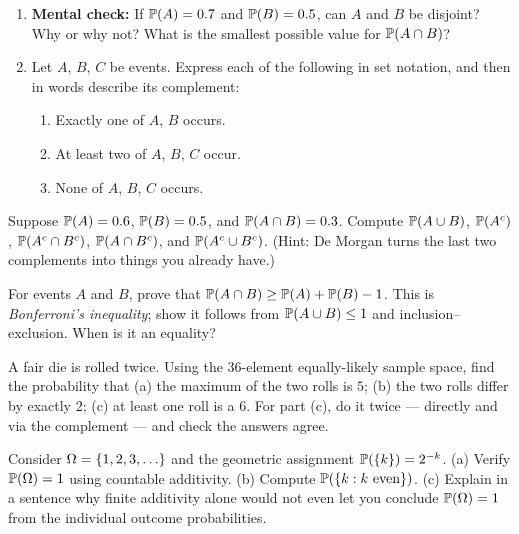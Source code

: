 \begin{exercise}
\label{ch03:exr-translate}
\begin{enumerate}[label=(\alph*)]
\item \textbf{Mental check:} If $\P(A) = 0.7$ and $\P(B) = 0.5$, can $A$ and $B$
be disjoint? Why or why not? What is the smallest possible value for
$\P(A \cap B)$?
\item Let $A$, $B$, $C$ be events. Express each of the following in set notation,
and then in words describe its complement:
  \begin{enumerate}[label=(\roman*)]
  \item Exactly one of $A$, $B$ occurs.
  \item At least two of $A$, $B$, $C$ occur.
  \item None of $A$, $B$, $C$ occurs.
  \end{enumerate}
\end{enumerate}
\end{exercise}

\begin{exercise}
\label{ch03:exr-warmup}
Suppose $\P(A) = 0.6$, $\P(B) = 0.5$, and $\P(A \cap B) = 0.3$. Compute
$\P(A \cup B)$, $\P(A^c)$, $\P(A^c \cap B^c)$, $\P(A \cap B^c)$, and
$\P(A^c \cup B^c)$. (Hint: De Morgan turns the last two complements into things
you already have.)
\end{exercise}

\begin{exercise}
\label{ch03:exr-bound}
For events $A$ and $B$, prove that $\P(A \cap B) \ge \P(A) + \P(B) - 1$. This is
\emph{Bonferroni's inequality}; show it follows from
$\P(A\cup B)\le 1$ and inclusion--exclusion. When is it an equality?
\end{exercise}

\begin{exercise}
\label{ch03:exr-counting}
A fair die is rolled twice. Using the $36$-element equally-likely sample space,
find the probability that (a) the maximum of the two rolls is $5$; (b) the two
rolls differ by exactly $2$; (c) at least one roll is a $6$. For part (c), do it
twice --- directly and via the complement --- and check the answers agree.
\end{exercise}

\begin{exercise}
\label{ch03:exr-fin-vs-count}
Consider $\Omega = \set{1,2,3,\dots}$ and the geometric assignment
$\P(\set{k}) = 2^{-k}$. (a) Verify $\P(\Omega) = 1$ using countable additivity.
(b) Compute $\P(\set{k : k \text{ even}})$. (c) Explain in a sentence why finite
additivity alone would not even let you conclude $\P(\Omega) = 1$ from the
individual outcome probabilities.
\end{exercise}

